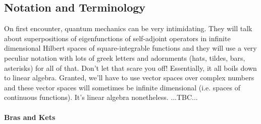 


\subsection{Notation and Terminology}
On first encounter, quantum mechanics can be very intimidating. They will talk about superpositions of eigenfunctions of self-adjoint operators in infinite dimensional Hilbert spaces of square-integrable functions and they will use a very peculiar notation with lots of greek letters and adornments (hats, tildes, bars, asterisks) for all of that. Don't let that scare you off! Essentially, it all boils down to linear algebra. Granted, we'll have to use vector spaces over complex numbers and these vector spaces will sometimes be infinite dimensional (i.e. spaces of continuous functions). It's linear algebra nonetheless. ...TBC...





\paragraph{Bras and Kets}

